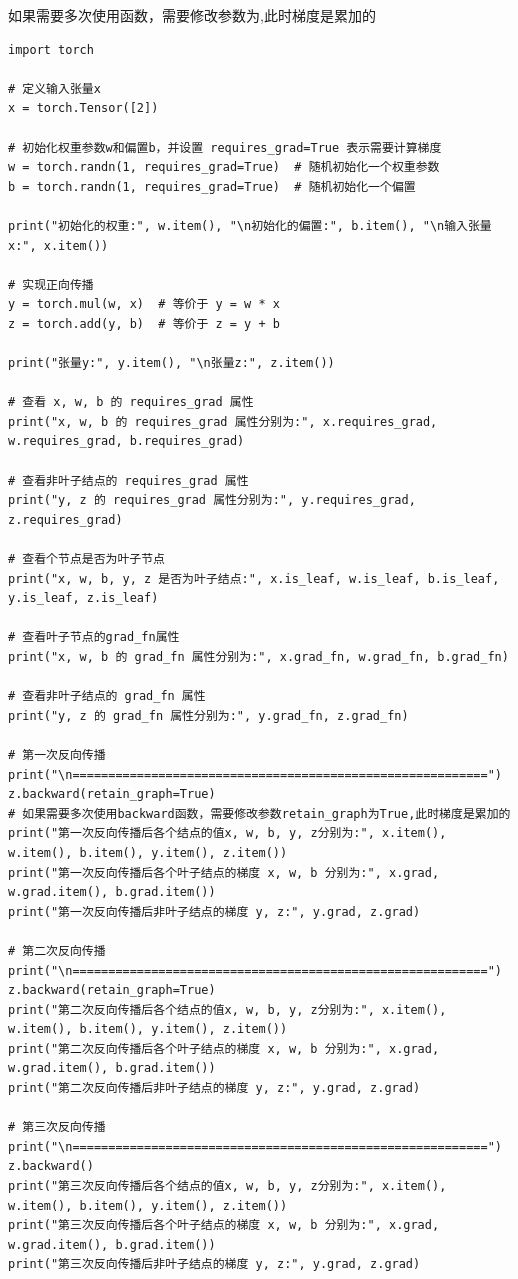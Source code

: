 如果需要多次使用函数，需要修改参数为,此时梯度是累加的

\begin{lstlisting}[style=pythonstyle]
import torch

# 定义输入张量x 
x = torch.Tensor([2])

# 初始化权重参数w和偏置b，并设置 requires_grad=True 表示需要计算梯度
w = torch.randn(1, requires_grad=True)  # 随机初始化一个权重参数
b = torch.randn(1, requires_grad=True)  # 随机初始化一个偏置

print("初始化的权重:", w.item(), "\n初始化的偏置:", b.item(), "\n输入张量x:", x.item())

# 实现正向传播
y = torch.mul(w, x)  # 等价于 y = w * x
z = torch.add(y, b)  # 等价于 z = y + b

print("张量y:", y.item(), "\n张量z:", z.item())

# 查看 x, w, b 的 requires_grad 属性
print("x, w, b 的 requires_grad 属性分别为:", x.requires_grad, w.requires_grad, b.requires_grad)

# 查看非叶子结点的 requires_grad 属性
print("y, z 的 requires_grad 属性分别为:", y.requires_grad, z.requires_grad)

# 查看个节点是否为叶子节点
print("x, w, b, y, z 是否为叶子结点:", x.is_leaf, w.is_leaf, b.is_leaf, y.is_leaf, z.is_leaf)

# 查看叶子节点的grad_fn属性
print("x, w, b 的 grad_fn 属性分别为:", x.grad_fn, w.grad_fn, b.grad_fn)

# 查看非叶子结点的 grad_fn 属性
print("y, z 的 grad_fn 属性分别为:", y.grad_fn, z.grad_fn)

# 第一次反向传播
print("\n==========================================================")
z.backward(retain_graph=True) 
# 如果需要多次使用backward函数，需要修改参数retain_graph为True,此时梯度是累加的
print("第一次反向传播后各个结点的值x, w, b, y, z分别为:", x.item(), w.item(), b.item(), y.item(), z.item())
print("第一次反向传播后各个叶子结点的梯度 x, w, b 分别为:", x.grad, w.grad.item(), b.grad.item())
print("第一次反向传播后非叶子结点的梯度 y, z:", y.grad, z.grad)

# 第二次反向传播
print("\n==========================================================")
z.backward(retain_graph=True)
print("第二次反向传播后各个结点的值x, w, b, y, z分别为:", x.item(), w.item(), b.item(), y.item(), z.item())
print("第二次反向传播后各个叶子结点的梯度 x, w, b 分别为:", x.grad, w.grad.item(), b.grad.item())
print("第二次反向传播后非叶子结点的梯度 y, z:", y.grad, z.grad)

# 第三次反向传播
print("\n==========================================================")
z.backward()
print("第三次反向传播后各个结点的值x, w, b, y, z分别为:", x.item(), w.item(), b.item(), y.item(), z.item())
print("第三次反向传播后各个叶子结点的梯度 x, w, b 分别为:", x.grad, w.grad.item(), b.grad.item())
print("第三次反向传播后非叶子结点的梯度 y, z:", y.grad, z.grad)
\end{lstlisting}
